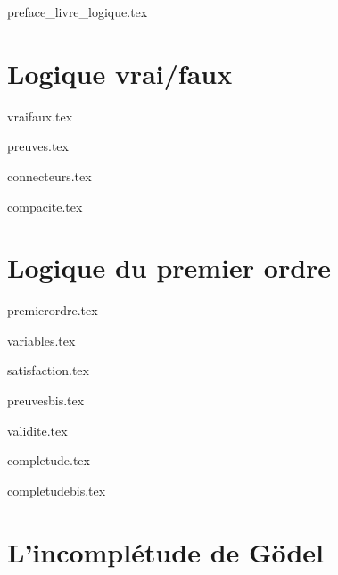 \documentclass[10pt,twoside,openright]{report}
\begin{document}
\renewcommand{\contentsname}{Sommaire}

{preface_livre_logique.tex}
\debutchapitres
{}


\clearemptydoublepage


\part{Logique vrai/faux}

{vraifaux.tex}

{preuves.tex}

{connecteurs.tex}

{compacite.tex}


\clearemptydoublepage
\part{Logique du premier ordre}

{premierordre.tex}

{variables.tex}
	
{satisfaction.tex}

{preuvesbis.tex}

{validite.tex}

{completude.tex}

{completudebis.tex}	


\clearemptydoublepage
\part{L'incomplétude de Gödel}
\end{document}
